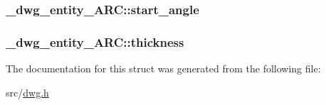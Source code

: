 \hypertarget{struct__dwg__entity__ARC_ae19dcc3fe6a4bbfcee25e4f2e22bcd2b}{
\subsubsection[{start\-\_\-angle}]{ {\bf \-\_\-dwg\-\_\-entity\-\_\-\-A\-R\-C\-::start\-\_\-angle}}}\label{struct__dwg__entity__ARC_ae19dcc3fe6a4bbfcee25e4f2e22bcd2b}
\hypertarget{struct__dwg__entity__ARC_a0bf7ed5a5b32f948f2a3c6bde43818bc}{
\subsubsection[{thickness}]{ {\bf \-\_\-dwg\-\_\-entity\-\_\-\-A\-R\-C\-::thickness}}}\label{struct__dwg__entity__ARC_a0bf7ed5a5b32f948f2a3c6bde43818bc}


\-The documentation for this struct was generated from the following file\-:\begin{DoxyCompactItemize}
\item 
src/\hyperlink{dwg_8h}{dwg.\-h}\end{DoxyCompactItemize}

